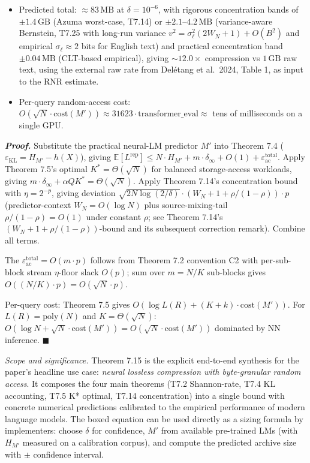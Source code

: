 \documentclass[
]{article}
\begin{document}
\begin{itemize}
of archive). This is the
practical sizing estimate, well below the Azuma worst-case bound.
\item Predicted total: $\approx 83\,\mathrm{MB}$ at $\delta = 10^{-6}$,
with rigorous concentration bands of $\pm 1.4\,\mathrm{GB}$
(Azuma worst-case, T7.14) or $\pm 2.1$--$4.2\,\mathrm{MB}$
(variance-aware Bernstein, T7.25 with long-run variance
$v^2 = \sigma_\ell^2 (2W_N+1) + O(B^2)$ and
empirical $\sigma_\ell \approx 2$ bits for English text) and
practical concentration band $\pm 0.04\,\mathrm{MB}$ (CLT-based
empirical), giving $\sim 12.0\times$ compression vs $1\,\mathrm{GB}$
raw text, using the external raw rate from Del{\'e}tang et al.\ 2024,
Table 1, as input to the RNR estimate.
\item Per-query random-access cost: $O(\sqrt{N} \cdot \mathrm{cost}(M'))
\approx 31623 \cdot \mathrm{transformer\_eval} \approx$ tens of
milliseconds on a single GPU.
\end{itemize}

\emph{\textbf{Proof.}} Substitute the practical neural-LM predictor
$M'$ into Theorem 7.4 ($\varepsilon_{\mathrm{KL}} = H_{M'} - h(X)$),
giving $\mathbb{E}[L^{\mathrm{rep}}] \leq N \cdot H_{M'} + m \cdot
\delta_\infty + O(1) + \varepsilon_{\mathrm{ac}}^{\mathrm{total}}$.
Apply Theorem 7.5's optimal $K^* = \Theta(\sqrt{N})$ for balanced
storage-access workloads, giving $m \cdot \delta_\infty + \alpha Q
K^* = \Theta(\sqrt{N})$. Apply Theorem 7.14's concentration bound
with $\eta = 2^{-p}$, giving deviation
$\sqrt{2 N \log(2/\delta)} \cdot (W_N + 1 + \rho/(1-\rho)) \cdot p$
(predictor-context $W_N = O(\log N)$ plus source-mixing-tail
$\rho/(1-\rho) = O(1)$ under constant $\rho$; see Theorem 7.14's
$(W_N + 1 + \rho/(1-\rho))$-bound and its subsequent correction
remark). Combine all terms.

The $\varepsilon_{\mathrm{ac}}^{\mathrm{total}} = O(m \cdot p)$
follows from Theorem 7.2 convention C2 with per-sub-block stream
$\eta$-floor slack $O(p)$; sum over $m = N/K$ sub-blocks gives
$O((N/K) \cdot p) = O(\sqrt{N} \cdot p)$.

Per-query cost: Theorem 7.5 gives
$O(\log L(R) + (K + k) \cdot \mathrm{cost}(M'))$. For
$L(R) = \mathrm{poly}(N)$ and $K = \Theta(\sqrt{N})$:
$O(\log N + \sqrt{N} \cdot \mathrm{cost}(M')) = O(\sqrt{N} \cdot
\mathrm{cost}(M'))$ dominated by NN inference.
\hfill$\blacksquare$

\emph{Scope and significance.} Theorem 7.15 is the explicit end-to-end
synthesis for the paper's headline use case: \emph{neural lossless
compression with byte-granular random access}. It composes the four
main theorems (T7.2 Shannon-rate, T7.4 KL accounting, T7.5 K* optimal,
T7.14 concentration) into a single bound with concrete numerical
predictions calibrated to the empirical performance of modern
language models. The boxed equation can be used directly as a sizing
formula by implementers: choose $\delta$ for confidence,
$M'$ from available pre-trained LMs (with $H_{M'}$ measured on a
calibration corpus), and compute the predicted archive size with
$\pm$ confidence interval.
\end{document}
